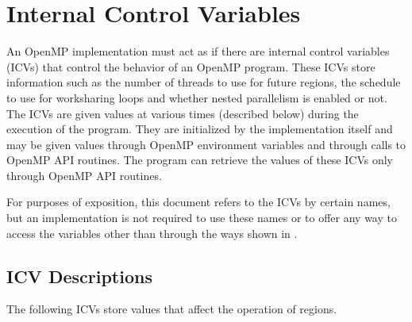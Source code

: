 \section{Internal Control Variables}
\label{sec:Internal Control Variables}
An OpenMP implementation must act as if there are internal control variables (ICVs)
that control the behavior of an OpenMP program. These ICVs store information such as
the number of threads to use for future  regions, the schedule to use for
worksharing loops and whether nested parallelism is enabled or not. The ICVs are given
values at various times (described below) during the execution of the program. They are
initialized by the implementation itself and may be given values through OpenMP
environment variables and through calls to OpenMP API routines. The program can
retrieve the values of these ICVs only through OpenMP API routines.

For purposes of exposition, this document refers to the ICVs by certain names, but an
implementation is not required to use these names or to offer any way to access the
variables other than through the ways shown in
.








\subsection{ICV Descriptions}
\label{subsec:ICV Descriptions}
The following ICVs store values that affect the operation of  regions.

